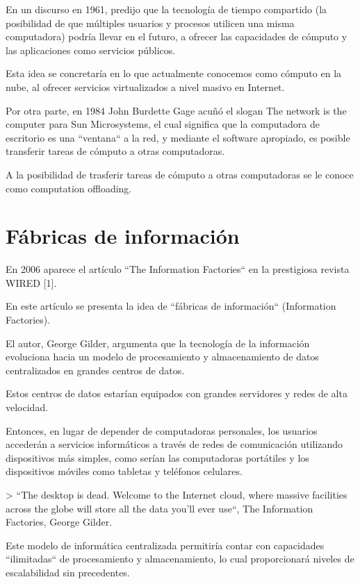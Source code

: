 \documentclass[11pt,a4paper,oneside]{book}
\begin{document}
En un discurso en 1961, predijo que la tecnología de tiempo compartido (la posibilidad de que múltiples usuarios y procesos utilicen una misma computadora) podría llevar en el futuro, a ofrecer las capacidades de cómputo y las aplicaciones como servicios públicos.

Esta idea se concretaría en lo que actualmente conocemos como cómputo en la nube, al ofrecer servicios virtualizados a nivel masivo en Internet.

Por otra parte, en 1984 John Burdette Gage acuñó el slogan The network is the computer para Sun Microsystems, el cual significa que la computadora de escritorio es una ``ventana`` a la red, y mediante el software apropiado, es posible transferir tareas de cómputo a otras computadoras.

A la posibilidad de trasferir tareas de cómputo a otras computadoras se le conoce como computation offloading.

\section{Fábricas de información}

En 2006 aparece el artículo ``The Information Factories`` en la prestigiosa revista WIRED [1].

En este artículo se presenta la idea de ``fábricas de información`` (Information Factories).

El autor, George Gilder, argumenta que la tecnología de la información evoluciona hacia un modelo de procesamiento y almacenamiento de datos centralizados en grandes centros de datos.

Estos centros de datos estarían equipados con grandes servidores y redes de alta velocidad.

Entonces, en lugar de depender de computadoras personales, los usuarios accederán a servicios informáticos a través de redes de comunicación utilizando dispositivos más simples, como serían las computadoras portátiles y los dispositivos móviles como tabletas y teléfonos celulares.

> ``The desktop is dead. Welcome to the Internet cloud, where massive facilities across the globe will store all the data you'll ever use``, The Information Factories, George Gilder.

Este modelo de informática centralizada permitiría contar con capacidades ``ilimitadas`` de procesamiento y almacenamiento, lo cual proporcionará niveles de escalabilidad sin precedentes.
\end{document}
